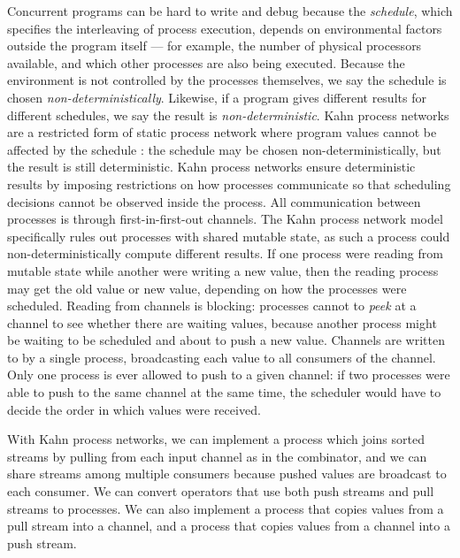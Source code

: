 Concurrent programs can be hard to write and debug because the \emph{schedule}, which specifies the interleaving of process execution, depends on environmental factors outside the program itself --- for example, the number of physical processors available, and which other processes are also being executed.
Because the environment is not controlled by the processes themselves, we say the schedule is chosen \emph{non-deterministically}.
Likewise, if a program gives different results for different schedules, we say the result is \emph{non-deterministic}.
Kahn process networks are a restricted form of static process network where program values cannot be affected by the schedule \cite{kahn1976coroutines}: the schedule may be chosen non-deterministically, but the result is still deterministic.
Kahn process networks ensure deterministic results by imposing restrictions on how processes communicate so that scheduling decisions cannot be observed inside the process.
All communication between processes is through first-in-first-out channels.
The Kahn process network model specifically rules out processes with shared mutable state, as such a process could non-deterministically compute different results.
If one process were reading from mutable state while another were writing a new value, then the reading process may get the old value or new value, depending on how the processes were scheduled.
Reading from channels is blocking: processes cannot to \emph{peek} at a channel to see whether there are waiting values, because another process might be waiting to be scheduled and about to push a new value.
Channels are written to by a single process, broadcasting each value to all consumers of the channel.
Only one process is ever allowed to push to a given channel: if two processes were able to push to the same channel at the same time, the scheduler would have to decide the order in which values were received.

With Kahn process networks, we can implement a process which joins sorted streams by pulling from each input channel as in the \Hs@join@ combinator, and we can share streams among multiple consumers because pushed values are broadcast to each consumer.
We can convert operators that use both push streams and pull streams to processes.
We can also implement a process that copies values from a pull stream into a channel, and a process that copies values from a channel into a push stream.


